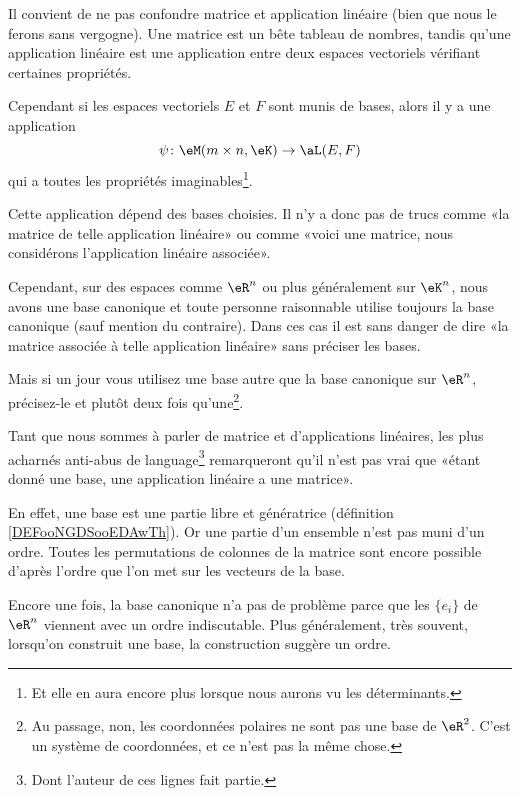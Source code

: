 \begin{normaltext}
	Il convient de ne pas confondre matrice et application linéaire (bien que nous le ferons sans vergogne). Une matrice est un bête tableau de nombres, tandis qu'une application linéaire est une application entre deux espaces vectoriels vérifiant certaines propriétés.

	Cependant si les espaces vectoriels \( E\) et \( F\) sont munis de bases, alors il y a une application
	\begin{equation}
		\psi\colon \eM(m\times n,\eK)\to \aL(E,F)
	\end{equation}
	qui a toutes les propriétés imaginables\footnote{Et elle en aura encore plus lorsque nous aurons vu les déterminants.}.

	Cette application dépend des bases choisies. Il n'y a donc pas de trucs comme «la matrice de telle application linéaire» ou comme «voici une matrice, nous considérons l'application linéaire associée».

	Cependant, sur des espaces comme \( \eR^n\) ou plus généralement sur \( \eK^n\), nous avons une base canonique et toute personne raisonnable utilise toujours la base canonique (sauf mention du contraire). Dans ces cas il est sans danger de dire «la matrice associée à telle application linéaire» sans préciser les bases.

	Mais si un jour vous utilisez une base autre que la base canonique sur \( \eR^n\), précisez-le et plutôt deux fois qu'une\footnote{Au passage, non, les coordonnées polaires ne sont pas une base de \( \eR^2\). C'est un système de coordonnées, et ce n'est pas la même chose.}.
\end{normaltext}

\begin{normaltext}
	Tant que nous sommes à parler de matrice et d'applications linéaires, les plus acharnés anti-abus de language\footnote{Dont l'auteur de ces lignes fait partie.} remarqueront qu'il n'est pas vrai que «étant donné une base, une application linéaire a une matrice».

	En effet, une base est une partie libre et génératrice (définition \ref{DEFooNGDSooEDAwTh}). Or une partie d'un ensemble n'est pas muni d'un ordre. Toutes les permutations de colonnes de la matrice sont encore possible d'après l'ordre que l'on met sur les vecteurs de la base.

	Encore une fois, la base canonique n'a pas de problème parce que les \( \{ e_i \}\) de \( \eR^n\) viennent avec un ordre indiscutable. Plus généralement, très souvent, lorsqu'on construit une base, la construction suggère un ordre.
\end{normaltext}

